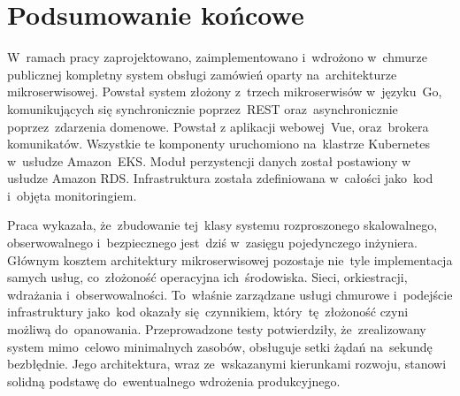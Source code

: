 \section*{Podsumowanie końcowe}
{}
\label{sec:podsumowanie-koncowe}

W~ramach pracy zaprojektowano, zaimplementowano i~wdrożono w~chmurze publicznej kompletny system obsługi zamówień
oparty na~architekturze mikroserwisowej. Powstał system złożony z~trzech mikroserwisów w~języku~Go, komunikujących
się synchronicznie poprzez~REST oraz~asynchronicznie poprzez~zdarzenia domenowe. Powstał z aplikacji webowej~Vue, oraz~brokera komunikatów. 
Wszystkie te komponenty uruchomiono na~klastrze Kubernetes w~usłudze Amazon~EKS. Moduł perzystencji danych został postawiony w usłudze
Amazon RDS. Infrastruktura została zdefiniowana w~całości jako~kod i~objęta monitoringiem.

Praca wykazała, że~zbudowanie tej~klasy systemu rozproszonego skalowalnego, obserwowalnego i~bezpiecznego
jest~dziś w~zasięgu pojedynczego inżyniera. Głównym kosztem architektury mikroserwisowej pozostaje nie~tyle
implementacja samych usług, co~złożoność operacyjna ich~środowiska. Sieci, orkiestracji, wdrażania i~obserwowalności.
To~właśnie zarządzane usługi chmurowe i~podejście infrastruktury jako~kod okazały się~czynnikiem, który~tę~złożoność
czyni możliwą do~opanowania. Przeprowadzone testy potwierdziły, że~zrealizowany system mimo~celowo minimalnych
zasobów, obsługuje setki żądań na~sekundę bezbłędnie. Jego architektura, wraz ze~wskazanymi kierunkami rozwoju,
stanowi solidną podstawę do~ewentualnego wdrożenia produkcyjnego.